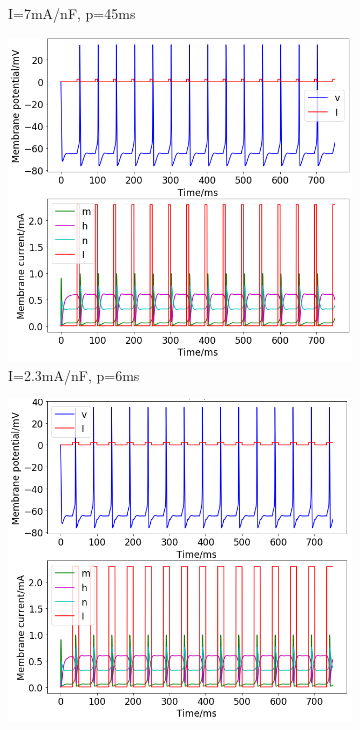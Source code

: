 \documentclass[twoside,twocolumn]{article}
\begin{document}
\begin{figure}[h]
\begin{subfigure}[t]{0.49\textwidth}
  \caption{I=7mA/nF, p=45ms}
  \label{sub:2c7-45}
  \end{subfigure}
\newline
  \begin{subfigure}[t]{0.49\textwidth}
    \includegraphics[width=\linewidth]{p23-6}
  \caption{I=2.3mA/nF, p=6ms}
  \label{sub:2c23-6}
  \end{subfigure}
  \begin{subfigure}[t]{0.49\textwidth}
    \includegraphics[width=\linewidth]{p23-17}

\end{subfigure}
\end{figure}
\end{document}
